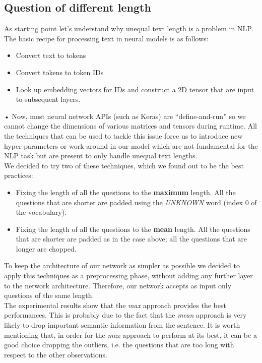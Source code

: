 \documentclass[10pt,twocolumn,letterpaper]{article}
\begin{document}
\subsection{Question of different length}
As starting point let's understand why unequal text length is a problem in NLP. The basic recipe for processing text in neural models is as follows:
\begin{itemize}\itemsep0.1pt
\item Convert text to tokens
\item Convert tokens to token IDs
\item Look up embedding vectors for IDs and construct a 2D tensor that are input to subsequent layers.
\end{itemize}•
Now, most neural network APIs (such as Keras) are “define-and-run” so we cannot change the dimensions of various matrices and tensors during runtime. All the techniques that can be used to tackle this issue force us to introduce new hyper-parameters or work-around in our model which are not fundamental for  the NLP task but are present to only handle unequal text lengths.\\
We decided to try two of these techniques, which we found out to be the best practices:
\begin{itemize}
	\item Fixing the length of all the questions to the \textbf{maximum} length. All the questions that are shorter are padded using the \emph{UNKNOWN} word (index $0$ of the vocabulary).
	\item Fixing the length of all the questions to the \textbf{mean} length. All the questions that are shorter are padded as in the case above; all the questions that are longer are chopped.
\end{itemize}
To keep the architecture of our network as simpler as possible we decided to apply this techniques as a preprocessing phase, without adding any further layer to the network architecture. Therefore, our network accepts as input only questions of the same length.\\
The experimental results show that the \emph{max} approach provides the best performances. This is probably due to the fact that the \emph{mean} approach is very likely to drop important semantic information from the sentence. It is worth mentioning that, in order for the \emph{max} approach to perform at its best, it can be a good choice dropping the outliers, i.e. the questions that are too long with respect to the other observations.
\end{document}
